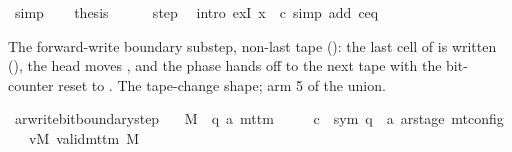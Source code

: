\begin{isabellebody}
\ simp\isanewline
\ \ \isamarkupfalse%
\ {\isacharquery}{\kern0pt}thesis\isanewline
\ \ \ \ \isamarkupfalse%
\ step\ \isamarkupfalse%
\ {\isacharparenleft}{\kern0pt}intro\ exI{\isacharbrackleft}{\kern0pt}\ x\ {\isacharequal}{\kern0pt}\ {\isacharquery}{\kern0pt}c{\isacharprime}{\kern0pt}{\isacharprime}{\kern0pt}{\isacharbrackright}{\kern0pt}{\isacharparenright}{\kern0pt}\ {\isacharparenleft}{\kern0pt}simp\ add{\isacharcolon}{\kern0pt}\ c{\isacharprime}{\kern0pt}{\isacharunderscore}{\kern0pt}eq{\isacharparenright}{\kern0pt}\isanewline
{}\isamarkupfalse%
%
\endisatagproof
{\isafoldproof}%
%
\isadelimproof
%
\endisadelimproof
%
\begin{isamarkuptext}%
The forward-write boundary substep, non-last tape
  (): the last cell of  is
  written (), the head moves , and the
  phase hands off to the next tape  with the bit-counter
  reset to .  The  tape-change shape;
  arm 5 of the union.%
\end{isamarkuptext}\isamarkuptrue%
\isamarkupfalse%
\ ar{\isacharunderscore}{\kern0pt}write{\isacharunderscore}{\kern0pt}bit{\isacharunderscore}{\kern0pt}boundary{\isacharunderscore}{\kern0pt}step{\isacharcolon}{\kern0pt}\isanewline
\ \ \ M\ {\isacharcolon}{\kern0pt}{\isacharcolon}{\kern0pt}\ {\isachardoublequoteopen}{\isacharparenleft}{\kern0pt}{\isacharprime}{\kern0pt}q{\isacharcomma}{\kern0pt}\ {\isacharprime}{\kern0pt}a{\isacharparenright}{\kern0pt}\ mttm{\isachardoublequoteclose}\isanewline
\ \ \ \ \ c{\isacharprime}{\kern0pt}\ {\isacharcolon}{\kern0pt}{\isacharcolon}{\kern0pt}\ {\isachardoublequoteopen}{\isacharparenleft}{\kern0pt}sym{}{\isacharcomma}{\kern0pt}\ {\isacharprime}{\kern0pt}q\ {\isasymtimes}\ {\isacharprime}{\kern0pt}a\ ar{\isacharunderscore}{\kern0pt}stage{\isacharparenright}{\kern0pt}\ mt{\isacharunderscore}{\kern0pt}config{\isachardoublequoteclose}\isanewline
\ \ \ vM{\isacharcolon}{\kern0pt}\ {\isachardoublequoteopen}valid{\isacharunderscore}{\kern0pt}mttm\ M{\isachardoublequoteclose}\isanewline

\end{isabellebody}
